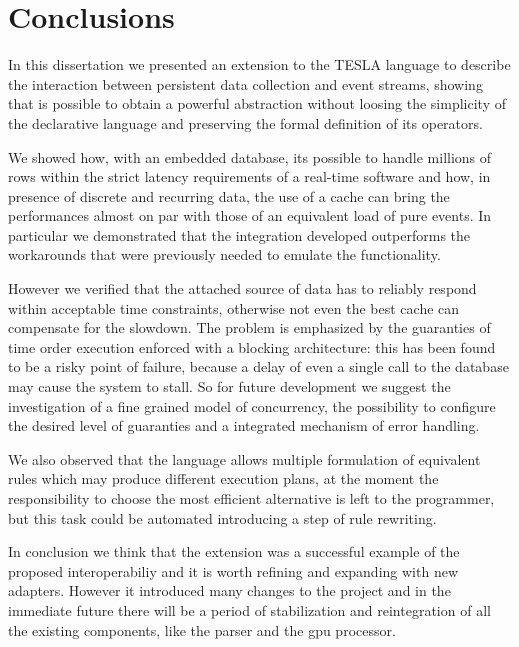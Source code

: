 \chapter{Conclusions}




In this dissertation we presented an extension to the TESLA language to describe the interaction between persistent data collection and event streams, showing that is possible to obtain a powerful abstraction without loosing the simplicity of the declarative language and preserving the formal definition of its operators.

We showed how, with an embedded database, its possible to handle millions of rows within the strict latency requirements of a real-time software and how, in presence of discrete and recurring data, the use of a cache can bring the performances almost on par with those of an equivalent load of pure events. In particular we demonstrated that the integration developed outperforms the workarounds that were previously needed to emulate the functionality.

However we verified that the attached source of data has to reliably respond within acceptable time constraints, otherwise not even the best cache can compensate for the slowdown. The problem is emphasized by the guaranties of time order execution enforced with a blocking architecture: this has been found to be a risky point of failure, because a delay of even a single call to the database may cause the system to stall. So for future development we suggest the investigation of a fine grained model of concurrency, the possibility to configure the desired level of guaranties and a integrated mechanism of error handling.

We also observed that the language allows multiple formulation of equivalent rules which may produce different execution plans, at the moment the responsibility to choose the most efficient alternative is left to the programmer, but this task could be automated introducing a step of rule rewriting.

In conclusion we think that the extension was a successful example of the proposed interoperabiliy and it is worth refining and expanding with new adapters. However it introduced many changes to the project and in the immediate future there will be a period of stabilization and reintegration of all the existing components, like the parser and the gpu processor.